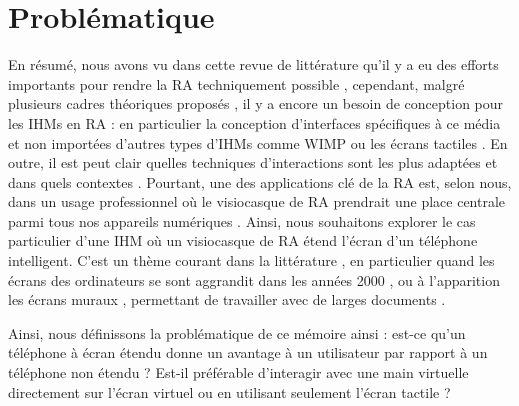 


\section{Problématique}
\label{sec:research_problem}
En résumé, nous avons vu dans cette revue de littérature qu'il y a eu des efforts importants pour rendre la RA techniquement possible \citep{Azuma2001, VanKrevelen2010}, cependant, malgré plusieurs cadres théoriques proposés \citep{Milgram1994, Rekimoto1995, Bimber2005, Ens2014a}, il y a encore un besoin de conception pour les IHMs en RA \citep{Billinghurst2015} : en particulier la conception d'interfaces spécifiques à ce média et non importées d'autres types d'IHMs comme WIMP ou les écrans tactiles \citep{VanDam1997, Billinghurst2005}. En outre, il est peut clair quelles techniques d'interactions sont les plus adaptées et dans quels contextes \citep{Argelaguet2013, Piumsomboon2013, Piumsomboon2014}. Pourtant, une des applications clé de la RA est, selon nous, dans un usage professionnel où le visiocasque de RA prendrait une place centrale parmi tous nos appareils numériques \citep{Rekimoto1995, Serrano2015, Grubert2015}. Ainsi, nous souhaitons explorer le cas particulier d'une IHM où un visiocasque de RA étend l'écran d'un téléphone intelligent. C'est un thème courant dans la littérature \citep{Bi2011, Jones2013, Benko2015}, en particulier quand les écrans des ordinateurs se sont aggrandit dans les années 2000 \citep{Baudisch2002}, ou à l'apparition les écrans muraux \citep{Liu2014, Berge2014}, permettant de travailler avec de larges documents \citep{Guiard2004}.

Ainsi, nous définissons la problématique de ce mémoire ainsi : est-ce qu'un téléphone à écran étendu donne un avantage à un utilisateur par rapport à un téléphone non étendu ? Est-il préférable d'interagir avec une main virtuelle directement sur l'écran virtuel ou en utilisant seulement l'écran tactile ?

